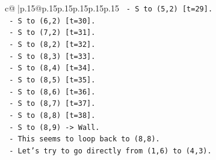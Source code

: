 \documentclass{article}
\begin{document}
{\begin{supertabular}{c@{$\;$}|p{.15\linewidth}@{}p{.15\linewidth}p{.15\linewidth}p{.15\linewidth}p{.15\linewidth}p{.15\linewidth}}
{{{\texttt{   {-} S to (5,2) {[}t=29{]}.} \\
\texttt{   {-} S to (6,2) {[}t=30{]}.} \\
\texttt{   {-} S to (7,2) {[}t=31{]}.} \\
\texttt{   {-} S to (8,2) {[}t=32{]}.} \\
\texttt{   {-} S to (8,3) {[}t=33{]}.} \\
\texttt{   {-} S to (8,4) {[}t=34{]}.} \\
\texttt{   {-} S to (8,5) {[}t=35{]}.} \\
\texttt{   {-} S to (8,6) {[}t=36{]}.} \\
\texttt{   {-} S to (8,7) {[}t=37{]}.} \\
\texttt{   {-} S to (8,8) {[}t=38{]}.} \\
\texttt{   {-} S to (8,9) {-}> Wall.} \\
\texttt{   {-} This seems to loop back to (8,8).} \\
\texttt{   {-} Let's try to go directly from (1,6) to (4,3).} \\
}}}
\end{supertabular}}
\end{document}
